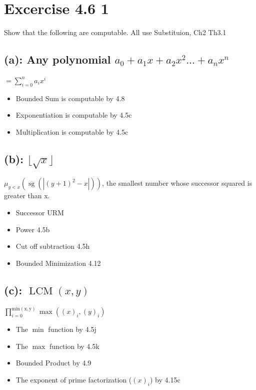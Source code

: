 \documentclass[fleqn]{article}
\begin{document}
\section*{Excercise 4.6 1}

Show that the following are computable. All use Substituion, Ch2 Th3.1

\subsection*{(a): Any polynomial $a_0 + a_1 x + a_2 x^2 ... + a_n x^n$}

$ = \sum_{i=0}^{n} a_i x^i$

\begin{itemize}
\item Bounded Sum is computable by 4.8
\item Exponentiation is computable by 4.5c
\item Multiplication is computable by 4.5c
\end{itemize}

\subsection*{(b): $\lfloor \sqrt{x} \rfloor$}

$\mu_{y<x}(\overline{\operatorname{sg}}(|(y+1)^2-x|))$, the smallest number whose successor squared is greater than x.

\begin{itemize}
\item Successor URM
\item Power 4.5b
\item Cut off subtraction 4.5h
\item Bounded Minimization 4.12
\end{itemize}

\subsection*{(c): $\operatorname{LCM}(x, y)$}

$\prod_{i=0}^{\operatorname{min(x, y)}}\operatorname{max}((x)_i, (y)_i)$

\begin{itemize}
\item The $\operatorname{min}$ function by 4.5j
\item The $\operatorname{max}$ function by 4.5k
\item Bounded Product by 4.9
\item The exponent of prime factorization ($(x)_i$) by 4.15c
\end{itemize}
\end{document}
